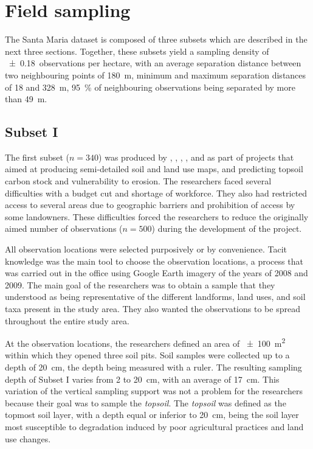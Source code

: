 \tocless\section{Field sampling}

The Santa Maria dataset is composed of three subsets which are described in the next three 
sections. Together, these subsets yield a sampling density of \num{\pm0.18}~observations per 
hectare, with an average separation distance between two neighbouring points of \SI{180}{\metre}, 
minimum and maximum separation distances of \num{18} and \SI{328}{\metre}, \SI{95}{\percent} of 
neighbouring observations being separated by more than \SI{49}{\metre}.

\tocless\subsection{Subset I}

The first subset ($n = 340$) was produced by , , 
, , and  as part
of projects that aimed at producing semi-detailed soil and land use maps, and predicting topsoil carbon stock 
and vulnerability to erosion. The researchers faced several difficulties with a budget cut and shortage 
of workforce. They also had restricted access to several areas due to geographic barriers and prohibition of 
access by some landowners. These difficulties forced the researchers to reduce the originally aimed number of 
observations ($n = 500$) during the development of the project.

All observation locations were selected purposively or by convenience. Tacit knowledge was the main tool
to choose the observation locations, a process that was carried out in the office using Google 
Earth\textregistered{} imagery of the years of 2008 and 2009. The main goal of the researchers was 
to obtain a sample that they understood as being representative of the different landforms, land uses, and 
soil taxa present in the study area. They also wanted the observations to be spread throughout the entire 
study area.

At the observation locations, the researchers defined an area of \SI{\pm100}{\metre\squared} within which
they opened three soil pits. Soil samples were collected up to a depth of \SI{20}{\centi\metre}, the depth 
being measured with a ruler. The resulting sampling depth of Subset I varies from \num{2} to 
\SI{20}{\centi\metre}, with an average of \SI{17}{\centi\metre}. This variation of the vertical sampling 
support was not a problem for the researchers because their goal was to sample the \emph{topsoil}. The
\emph{topsoil} was defined as the topmost soil layer, with a depth equal or inferior to 
\SI{20}{\centi\metre}, being the soil layer most susceptible to degradation induced by poor agricultural 
practices and land use changes.

